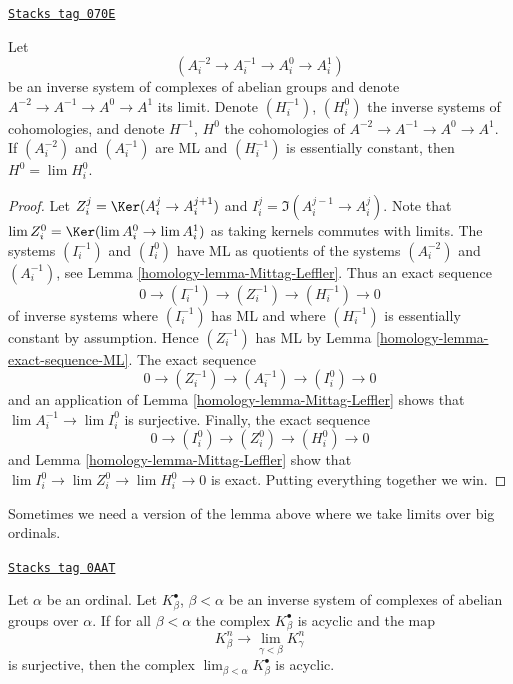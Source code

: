 \begin{lemma}
\label{homology-lemma-apply-Mittag-Leffler-again}
\href{https://stacks.math.columbia.edu/tag/070E}{\texttt{Stacks tag 070E}}

Let
$$
(A^{-2}_i \to A^{-1}_i \to A^0_i \to A^1_i)
$$
be an inverse system of complexes of abelian groups and denote
$A^{-2} \to A^{-1} \to A^0 \to A^1$ its limit. Denote
$(H_i^{-1})$, $(H_i^0)$ the inverse systems of cohomologies, and
denote $H^{-1}$, $H^0$ the cohomologies of $A^{-2} \to A^{-1} \to A^0 \to A^1$.
If $(A^{-2}_i)$ and $(A^{-1}_i)$ are ML and
$(H^{-1}_i)$ is essentially constant, then
$H^0 = \lim H_i^0$.
\end{lemma}

\begin{proof}

Let $Z^j_i = \Ker(A^j_i \to A^{j + 1}_i)$ and
$I^j_i = \Im(A^{j - 1}_i \to A^j_i)$.
Note that $\lim Z^0_i = \Ker(\lim A^0_i \to \lim A^1_i)$ as
taking kernels commutes with limits.
The systems $(I^{-1}_i)$ and $(I^0_i)$ have ML as quotients of
the systems $(A^{-2}_i)$ and $(A^{-1}_i)$, see
Lemma \ref{homology-lemma-Mittag-Leffler}.
Thus an exact sequence
$$
0 \to (I^{-1}_i) \to (Z^{-1}_i) \to (H^{-1}_i) \to 0
$$
of inverse systems where $(I^{-1}_i)$ has ML
and where $(H^{-1}_i)$ is essentially constant by assumption.
Hence $(Z^{-1}_i)$ has ML by
Lemma \ref{homology-lemma-exact-sequence-ML}.
The exact sequence
$$
0 \to (Z^{-1}_i) \to (A^{-1}_i) \to (I^0_i) \to 0
$$
and an application of
Lemma \ref{homology-lemma-Mittag-Leffler}
shows that $\lim A^{-1}_i \to \lim I^0_i$ is surjective.
Finally, the exact sequence
$$
0 \to (I^0_i) \to (Z^0_i) \to (H^0_i) \to 0
$$
and
Lemma \ref{homology-lemma-Mittag-Leffler}
show that $\lim I^0_i \to \lim Z^0_i \to \lim H^0_i \to 0$
is exact. Putting everything together we win.
\end{proof}

Sometimes we need a version of the lemma above where we take limits
over big ordinals.

\begin{lemma}
\label{homology-lemma-ML-over-ordinals}
\href{https://stacks.math.columbia.edu/tag/0AAT}{\texttt{Stacks tag 0AAT}}

Let $\alpha$ be an ordinal. Let $K_\beta^\bullet$, $\beta < \alpha$
be an inverse system of complexes of abelian groups over $\alpha$. If
for all $\beta < \alpha$ the complex $K_\beta^\bullet$ is acyclic and
the map
$$
K^n_\beta \longrightarrow \lim_{\gamma < \beta} K^n_\gamma
$$
is surjective, then the complex
$\lim_{\beta < \alpha} K_\beta^\bullet$ is acyclic.
\end{lemma}


